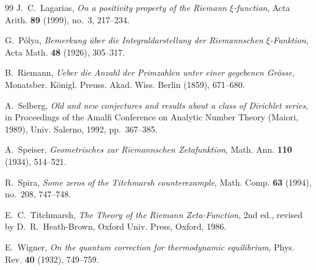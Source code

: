 \documentclass[11pt,reqno]{amsart}
\theoremstyle{definition}
\theoremstyle{remark}
\numberwithin{equation}{section}
\begin{document}
\begin{thebibliography}{99}
J.~C.~Lagarias, \emph{On a positivity property of the Riemann $\xi$-function}, Acta Arith. \textbf{89} (1999), no.~3, 217--234.

G.~P\'olya, \emph{Bemerkung \"uber die Integraldarstellung der Riemannschen $\xi$-Funktion}, Acta Math. \textbf{48} (1926), 305--317.

B.~Riemann, \emph{Ueber die Anzahl der Primzahlen unter einer gegebenen Gr\"osse}, Monatsber. K\"onigl. Preuss. Akad. Wiss. Berlin (1859), 671--680.

A.~Selberg, \emph{Old and new conjectures and results about a class of Dirichlet series}, in Proceedings of the Amalfi Conference on Analytic Number Theory (Maiori, 1989), Univ. Salerno, 1992, pp.~367--385.

A.~Speiser, \emph{Geometrisches zur Riemannschen Zetafunktion}, Math. Ann. \textbf{110} (1934), 514--521.

R.~Spira, \emph{Some zeros of the Titchmarsh counterexample}, Math. Comp. \textbf{63} (1994), no.~208, 747--748.

E.~C.~Titchmarsh, \emph{The Theory of the Riemann Zeta-Function}, 2nd ed., revised by D.~R.~Heath-Brown, Oxford Univ. Press, Oxford, 1986.

E.~Wigner, \emph{On the quantum correction for thermodynamic equilibrium}, Phys. Rev. \textbf{40} (1932), 749--759.

\end{thebibliography}
\end{document}

